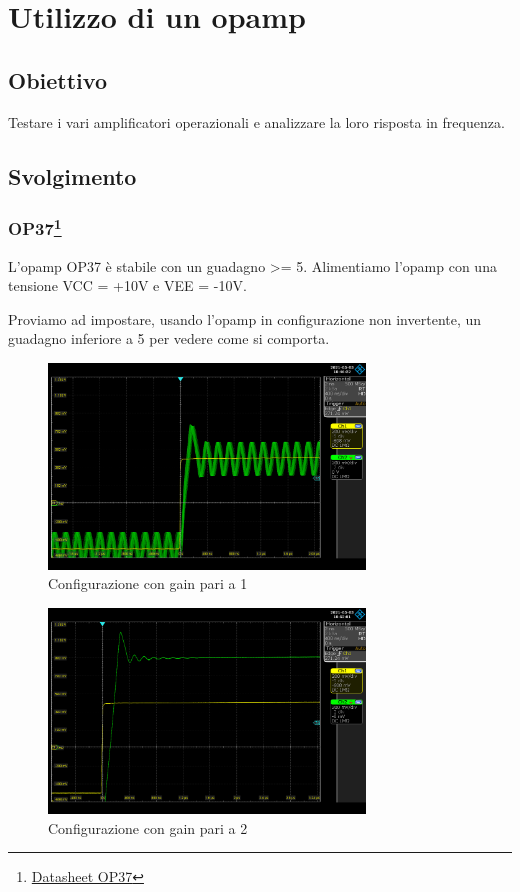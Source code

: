 \chapter{Utilizzo di un opamp}

\section*{Obiettivo}

Testare i vari amplificatori operazionali e analizzare la loro risposta in frequenza.

\section*{Svolgimento}
\subsection*{OP37\footnote{\href{https://www.analog.com/media/en/technical-documentation/data-sheets/OP37.pdf}{Datasheet OP37}}}


L'opamp OP37 è stabile con un guadagno >= 5. 
Alimentiamo l'opamp con una tensione VCC = +10V e VEE = -10V.


Proviamo ad impostare, usando l'opamp in configurazione non invertente, un guadagno inferiore a 5 per vedere come si comporta.

\begin{figure}[H]
\centering
\includegraphics[width=0.75\textwidth]{assets/exp8/Guadagno_1.png}
\caption{Configurazione con gain pari a 1}
\end{figure}

\begin{figure}[H]
\centering
\includegraphics[width=0.75\textwidth]{assets/exp8/Guadagno_2.png}
\caption{Configurazione con gain pari a 2}
\end{figure}

